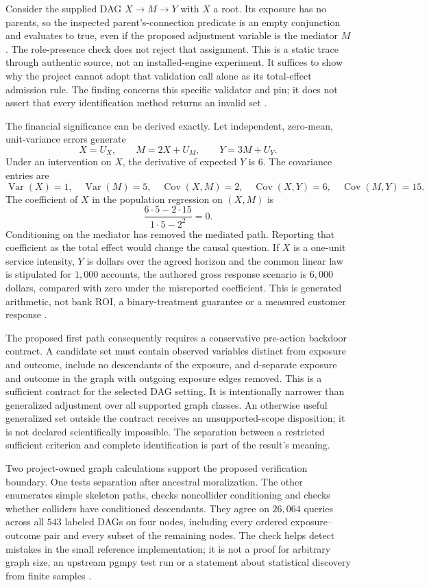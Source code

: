 Consider the supplied DAG $X\to M\to Y$ with $X$ a root. Its exposure
has no parents, so the inspected parent's-connection predicate is an empty
conjunction and evaluates to true, even if the proposed adjustment variable
is the mediator $M$. The role-presence check does not reject that assignment.
This is a static trace through authentic source, not an installed-engine
experiment. It suffices to show why the project cannot adopt that validation
call alone as its total-effect admission rule. The finding concerns this
specific validator and pin; it does not assert that every identification
method returns an invalid set
\cite{exec13_pgmpy_reuse_primary,exec13_pgmpy_reuse_oracle}.

The financial significance can be derived exactly. Let independent,
zero-mean, unit-variance errors generate
\[
 X=U_X,\qquad M=2X+U_M,\qquad Y=3M+U_Y.
\]
Under an intervention on $X$, the derivative of expected $Y$ is $6$.
The covariance entries are
\[
 \operatorname{Var}(X)=1,\quad \operatorname{Var}(M)=5,\quad
 \operatorname{Cov}(X,M)=2,\quad
 \operatorname{Cov}(X,Y)=6,\quad \operatorname{Cov}(M,Y)=15.
\]
The coefficient of $X$ in the population regression on $(X,M)$ is
\[
 \frac{6\cdot5-2\cdot15}{1\cdot5-2^2}=0.
\]
Conditioning on the mediator has removed the mediated path. Reporting that
coefficient as the total effect would change the causal question. If $X$
is a one-unit service intensity, $Y$ is dollars over the agreed horizon and
the common linear law is stipulated for $1{,}000$ accounts, the authored
gross response scenario is $6{,}000$ dollars, compared with zero under the
misreported coefficient. This is generated arithmetic, not bank ROI, a
binary-treatment guarantee or a measured customer response
\cite{exec13_pgmpy_reuse_oracle}.

The proposed first path consequently requires a conservative pre-action
backdoor contract. A candidate set must contain observed variables distinct
from exposure and outcome, include no descendants of the exposure, and
d-separate exposure and outcome in the graph with outgoing exposure edges
removed. This is a sufficient contract for the selected DAG setting. It
is intentionally narrower than generalized adjustment over all supported
graph classes. An otherwise useful generalized set outside the contract
receives an unsupported-scope disposition; it is not declared scientifically
impossible. The separation between a restricted sufficient criterion and
complete identification is part of the result's meaning.

Two project-owned graph calculations support the proposed verification
boundary. One tests separation after ancestral moralization. The other
enumerates simple skeleton paths, checks noncollider conditioning and checks
whether colliders have conditioned descendants. They agree on $26{,}064$
queries across all $543$ labeled DAGs on four nodes, including every ordered
exposure--outcome pair and every subset of the remaining nodes. The check
helps detect mistakes in the small reference implementation; it is not a
proof for arbitrary graph size, an upstream pgmpy test run or a statement
about statistical discovery from finite samples
\cite{exec13_pgmpy_reuse_oracle}.

